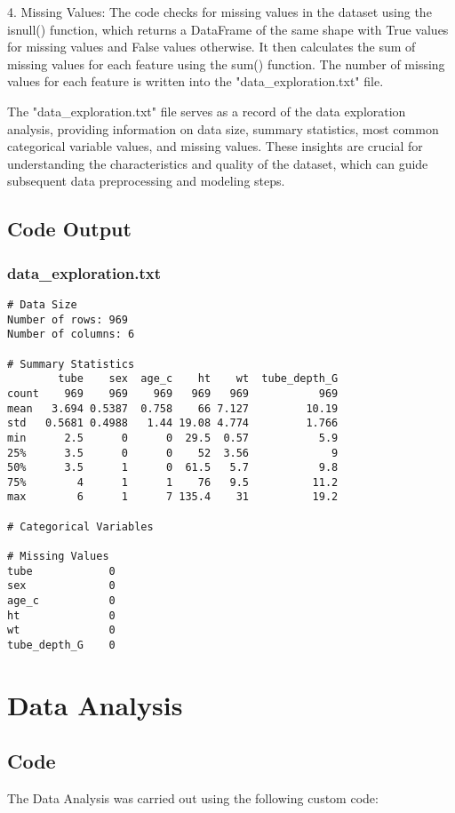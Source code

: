 \documentclass[11pt]{article}
\begin{document}
4. Missing Values:
   The code checks for missing values in the dataset using the isnull() function, which returns a DataFrame of the same shape with True values for missing values and False values otherwise. It then calculates the sum of missing values for each feature using the sum() function. The number of missing values for each feature is written into the "data\_exploration.txt" file.

The "data\_exploration.txt" file serves as a record of the data exploration analysis, providing information on data size, summary statistics, most common categorical variable values, and missing values. These insights are crucial for understanding the characteristics and quality of the dataset, which can guide subsequent data preprocessing and modeling steps.

\subsection{Code Output}

\subsubsection*{data\_exploration.txt}

\begin{Verbatim}[tabsize=4]
# Data Size
Number of rows: 969
Number of columns: 6

# Summary Statistics
        tube    sex  age_c    ht    wt  tube_depth_G
count    969    969    969   969   969           969
mean   3.694 0.5387  0.758    66 7.127         10.19
std   0.5681 0.4988   1.44 19.08 4.774         1.766
min      2.5      0      0  29.5  0.57           5.9
25%      3.5      0      0    52  3.56             9
50%      3.5      1      0  61.5   5.7           9.8
75%        4      1      1    76   9.5          11.2
max        6      1      7 135.4    31          19.2

# Categorical Variables

# Missing Values
tube            0
sex             0
age_c           0
ht              0
wt              0
tube_depth_G    0
\end{Verbatim}

\section{Data Analysis}
\subsection{{Code}}
The Data Analysis was carried out using the following custom code:
\end{document}
